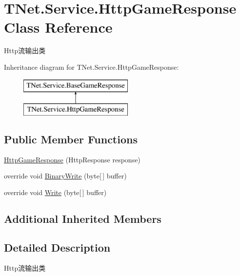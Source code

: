 \hypertarget{class_t_net_1_1_service_1_1_http_game_response}{}\section{T\+Net.\+Service.\+Http\+Game\+Response Class Reference}
\label{class_t_net_1_1_service_1_1_http_game_response}


Http流输出类  


Inheritance diagram for T\+Net.\+Service.\+Http\+Game\+Response\+:\begin{figure}[H]
\begin{center}
\leavevmode
\includegraphics[height=2.000000cm]{class_t_net_1_1_service_1_1_http_game_response}
\end{center}
\end{figure}
\subsection*{Public Member Functions}
\begin{DoxyCompactItemize}
\item 
\mbox{\hyperlink{class_t_net_1_1_service_1_1_http_game_response_add26348166305b88bb9bba5978425c44}{Http\+Game\+Response}} (Http\+Response response)
\item 
override void \mbox{\hyperlink{class_t_net_1_1_service_1_1_http_game_response_a7fe3b5c8af0ef5f618bbc4040d3a4b3c}{Binary\+Write}} (byte\mbox{[}$\,$\mbox{]} buffer)
\item 
override void \mbox{\hyperlink{class_t_net_1_1_service_1_1_http_game_response_adab6896df13148c3b3e5e61cd98649e9}{Write}} (byte\mbox{[}$\,$\mbox{]} buffer)
\end{DoxyCompactItemize}
\subsection*{Additional Inherited Members}


\subsection{Detailed Description}
Http流输出类 



